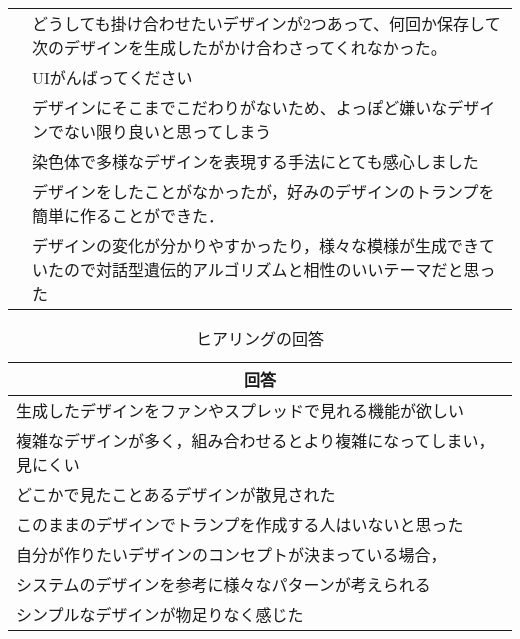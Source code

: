 \begin{table}[htbp]
\begin{tabular}{|c|p{29em}|}
                & どうしても掛け合わせたいデザインが2つあって、何回か保存して次のデザインを生成したがかけ合わさってくれなかった。\\ \cline{2-2}
                &UIがんばってください\\\cline{2-2}
                &デザインにそこまでこだわりがないため、よっぽど嫌いなデザインでない限り良いと思ってしまう\\\cline{2-2}
                &染色体で多様なデザインを表現する手法にとても感心しました\\\cline{2-2}
                &デザインをしたことがなかったが，好みのデザインのトランプを簡単に作ることができた．\\\cline{2-2}
                &デザインの変化が分かりやすかったり，様々な模様が生成できていたので対話型遺伝的アルゴリズムと相性のいいテーマだと思った\\ \hline
    \end{tabular}
    \label{free6}
\end{table}

\begin{table}[t]
    \centering
    \caption{ヒアリングの回答}
    \begin{tabular}{|l|}
    \hline
    \multicolumn{1}{|c|}{回答}                              \\ \hline
    生成したデザインをファンやスプレッドで見れる機能が欲しい                                 \\ \hline
    複雑なデザインが多く，組み合わせるとより複雑になってしまい，見にくい                    \\ \hline
    どこかで見たことあるデザインが散見された                                  \\ \hline
    このままのデザインでトランプを作成する人はいないと思った                          \\ \hline
    自分が作りたいデザインのコンセプトが決まっている場合，\\システムのデザインを参考に様々なパターンが考えられる \\ \hline
    シンプルなデザインが物足りなく感じた                                    \\ \hline
    \end{tabular}
    \label{free7}
\end{table}



